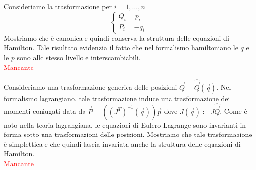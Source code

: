 \begin{example}
    Consideriamo la trasformazione per $ i = 1, \ldots, n $
    \[
        \begin{cases}
            Q_i = p_i \\
            P_i = -q_i
        \end{cases}
    \]
    Mostriamo che è canonica e quindi conserva la struttura delle equazioni di Hamilton. Tale risultato evidenzia il fatto che nel formalismo hamiltoniano le $ q $ e le $ p $ sono allo stesso livello e interscambiabili. \\
    \textcolor{red}{Mancante}
\end{example}

\begin{example}
    Consideriamo una trasformazione generica delle posizioni $ \vec{Q} = \hat{\vec{Q}}(\vec{q}) $. Nel formalismo lagrangiano, tale trasformazione induce una trasformazione dei momenti coniugati data da $ \vec{P} = ((J^T)^{-1}(\vec{q}))\vec{p} $ dove $ J(\vec{q}) \coloneqq J \hat{\vec{Q}} $. Come è noto nella teoria lagrangiana, le equazioni di Eulero-Lagrange sono invarianti in forma sotto una trasformazioni delle posizioni. Mostriamo che tale trasformazione è simplettica e che quindi lascia invariata anche la struttura delle equazioni di Hamilton. \\
    \textcolor{red}{Mancante}
\end{example}
